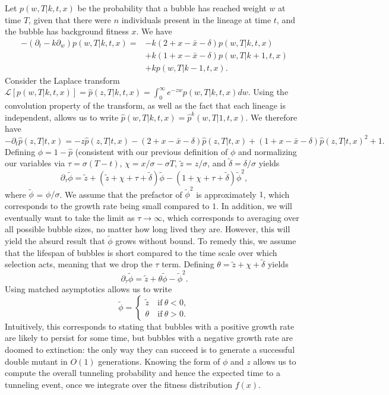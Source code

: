 \documentclass[rmp]{revtex4}
\begin{document}
Let $p(w,T|k,t,x)$ be the probability that a bubble has reached weight $w$ at time $T$, given that there were $n$ individuals present in the lineage at time $t$, and the bubble has background fitness $x$.
We have
\begin{align*}
-(\partial_t -k\partial_w) p(w,T|k,t,x) = &-k(2+x-\bar{x}-\delta)p(w,T|k,t,x) \\
& + k(1+x-\bar{x}-\delta)p(w,T|k+1,t,x) \\
& +kp(w,T|k-1,t,x).
\end{align*}
Consider the Laplace transform $\mathcal{L}\left[ p(w,T|k,t,x) \right] = \hat{p}(z,T|k,t,x) =  \int_0^\infty e^{-zw} p(w,T|k,t,x) dw$.
Using the convolution property of the transform, as well as the fact that each lineage is independent, allows us to write $\hat{p}(w,T|k,t,x) = \hat{p}^k(w,T|1,t,x)$.
We therefore have
\begin{equation}
-\partial_t\hat{p}(z,T|t,x) = -z\hat{p}(z,T|t,x) -(2+x-\bar{x}-\delta)\hat{p}(z,T|t,x) + (1+x-\bar{x}-\delta)\hat{p}(z,T|t,x)^2 + 1.
\end{equation}
Defining $\phi = 1-\hat{p}$ (consistent with our previous definition of $\phi$ and normalizing our variables via $\tau = \sigma(T-t)$, $\chi = x/\sigma-\sigma T$, $\tilde{z} = z/\sigma$, and $\tilde{\delta} = \delta/\sigma$ yields
\begin{equation}
\partial_\tau \tilde{\phi} = \tilde{z} + (\tilde{z} + \chi + \tau + \tilde{\delta})\tilde{\phi} - (1 + \chi + \tau + \tilde{\delta})\tilde{\phi}^2,
\end{equation}
where $\tilde{\phi}$ = $\phi/\sigma$.
We assume that the prefactor of $\tilde{\phi}^2$ is approximately $1$, which corresponds to the growth rate being small compared to $1$.
In addition, we will eventually want to take the limit as $\tau \to \infty$, which corresponds to averaging over all possible bubble sizes, no matter how long lived they are.
However, this will yield the absurd result that $\tilde{\phi}$ grows without bound.
To remedy this, we assume that the lifespan of bubbles is short compared to the time scale over which selection acts, meaning that we drop the $\tau$ term.
Defining $\theta = \tilde{z} + \chi + \tilde{\delta}$ yields
\begin{equation}
\partial_\tau \tilde{\phi} = \tilde{z} + \theta \tilde{\phi} - \tilde{\phi}^2.
\end{equation}
Using matched asymptotics allows us to write
\begin{equation}
\tilde{\phi} = 
\begin{cases}
\tilde{z} &\mathrm{~if~} \theta < 0, \\
\theta &\mathrm{~if~} \theta > 0.
\end{cases}
\end{equation}
Intuitively, this corresponds to stating that bubbles with a positive growth rate are likely to persist for some time, but bubbles with a negative growth rate are doomed to extinction: the only way they can succeed is to generate a successful double mutant in $O(1)$ generations.
Knowing the form of $\phi$ and $z$ allows us to compute the overall tunneling probability and hence the expected time to a tunneling event, once we integrate over the fitness distribution $f(x)$.
\end{document}
